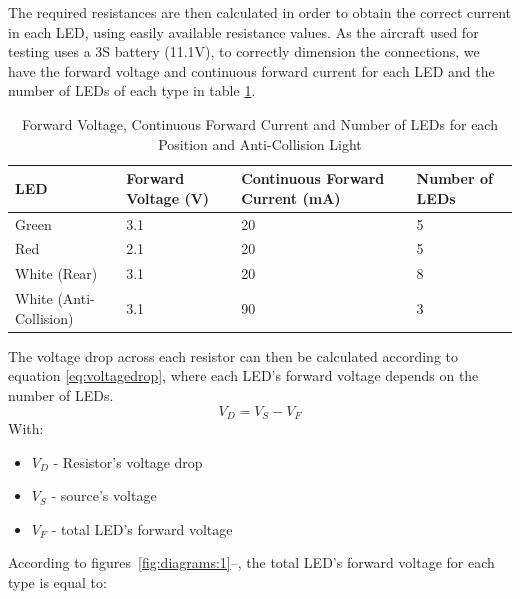 The required resistances are then calculated in order to obtain the correct current in each LED, using easily available resistance values. As the aircraft used for testing uses a 3S battery (11.1V), to correctly dimension the connections, we have the forward voltage and continuous forward current for each LED and the number of LEDs of each type in table \ref{tab:voltagecurrent}.\\
\begin{table}[!htb]
\centering
\caption[Forward Voltage, Continuous Forward Current and Number of LEDs for each Position and Anti-Collision Light \citep{OptoSupply}\citep{WahWangHoldingsCo.LTD}\citep{WahWangHoldingsCo.LTDa}\citep{WahWangHoldingsCo.LTDb}]{Forward Voltage, Continuous Forward Current and Number of LEDs for each Position and Anti-Collision Light \citep{OptoSupply}\citep{WahWangHoldingsCo.LTD}\citep{WahWangHoldingsCo.LTDa}\citep{WahWangHoldingsCo.LTDb}}
\label{tab:voltagecurrent}
\begin{tabular}{@{}llll@{}}
\toprule
LED                    & Forward Voltage (V) & Continuous Forward Current (mA) & Number of LEDs \\ \midrule
Green                  & 3.1                 & 20		&	5                       \\
Red                    & 2.1                 & 20       &	5                       \\
White (Rear)           & 3.1                 & 20       &	8                       \\
White (Anti-Collision) & 3.1                 & 90       &	3                       \\ \bottomrule
\end{tabular}
\end{table}
The voltage drop across each resistor can then be calculated according to equation \eqref{eq:voltagedrop}, where each LED's forward voltage depends on the number of LEDs.
\begin{equation}\label{eq:voltagedrop}
V_{D}=V_{S}-V_{F}
\end{equation}
With:
\begin{itemize}
\item $V_{D}$ - Resistor's voltage drop
\item $V_{S}$ - source's voltage
\item $V_{F}$ - total LED's forward voltage 
\end{itemize}
According to figures~\ref{fig:diagrams:1}--, the total LED's forward voltage for each type is equal to:

